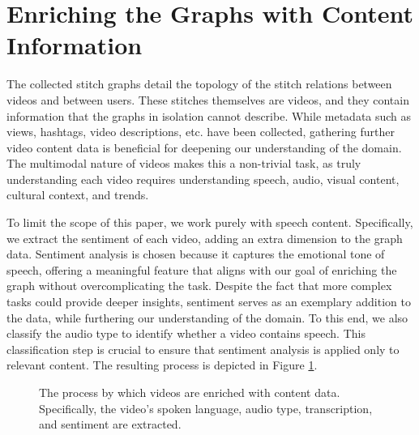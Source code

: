 \section{Enriching the Graphs with Content Information}
The collected stitch graphs detail the topology of the stitch relations between videos and between users. These stitches themselves are videos, and they contain information that the graphs in isolation cannot describe. While metadata such as views, hashtags, video descriptions, etc. have been collected, gathering further video content data is beneficial for deepening our understanding of the domain. The multimodal nature of videos makes this a non-trivial task, as truly understanding each video requires understanding speech, audio, visual content, cultural context, and trends. 

To limit the scope of this paper, we work purely with speech content. Specifically, we extract the sentiment of each video, adding an extra dimension to the graph data. Sentiment analysis is chosen because it captures the emotional tone of speech, offering a meaningful feature that aligns with our goal of enriching the graph without overcomplicating the task. Despite the fact that more complex tasks could provide deeper insights, sentiment serves as an exemplary addition to the data, while furthering our understanding of the domain. To this end, we also classify the audio type to identify whether a video contains speech. This classification step is crucial to ensure that sentiment analysis is applied only to relevant content. The resulting process is depicted in Figure \ref{fig:dataaugmentation}.

\begin{figure}[H]
    \centering
    \begin{adjustwidth}{-\textwidth}{-\textwidth}
        \centering
        
    \end{adjustwidth}
    \caption{The process by which videos are enriched with content data. Specifically, the video's spoken language, audio type, transcription, and sentiment are extracted.}
    \label{fig:dataaugmentation}
\end{figure}

\begin{comment}
1232/1363=90%
137/145=94%
275/345=80%
463/555=83%
3329/3737=89%
550/600=92%
841/846=99%
44/46=96%
615/680=90%
431/480=90%
total=90%

(40653-227+86*2)/2

abortion: 45
\end{comment}

